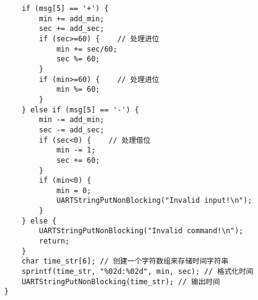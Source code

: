 \documentclass[12pt, a4paper, oneside]{ctexart}
\begin{document}
\begin{enumerate}[listparindent=2em]
\begin{lstlisting}
    if (msg[5] == '+') {
        min += add_min;
        sec += add_sec;
        if (sec>=60) {    // 处理进位
            min += sec/60;
            sec %= 60;
        }
        if (min>=60) {    // 处理进位
            min %= 60;
        }
    } else if (msg[5] == '-') {
        min -= add_min;
        sec -= add_sec;
        if (sec<0) {    // 处理借位
            min -= 1;
            sec += 60;
        }
        if (min<0) {    
            min = 0;
            UARTStringPutNonBlocking("Invalid input!\n");
        }
    } else {
        UARTStringPutNonBlocking("Invalid command!\n");
        return;
    }
    char time_str[6]; // 创建一个字符数组来存储时间字符串
    sprintf(time_str, "%02d:%02d", min, sec); // 格式化时间
    UARTStringPutNonBlocking(time_str); // 输出时间 
}
    \end{lstlisting}
        


\end{enumerate}
        
\end{document}
